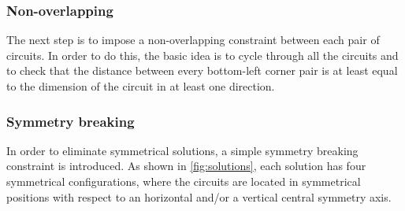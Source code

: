 \documentclass[a4paper, 12pt]{article}
\begin{document}
\subsubsection{Non-overlapping}

The next step is to impose a non-overlapping constraint between each pair of circuits. In order to do this, the basic idea is to cycle through all the circuits and to check that the distance between every bottom-left corner pair is at least equal to the dimension of the circuit in at least one direction.


\subsubsection{Symmetry breaking}\label{sec:symmetry}

In order to eliminate symmetrical solutions, a simple symmetry breaking constraint is introduced. As shown in \cref{fig:solutions}, each solution has four symmetrical configurations, where the circuits are located in symmetrical positions with respect to an horizontal and/or a vertical central symmetry axis.
\end{document}
